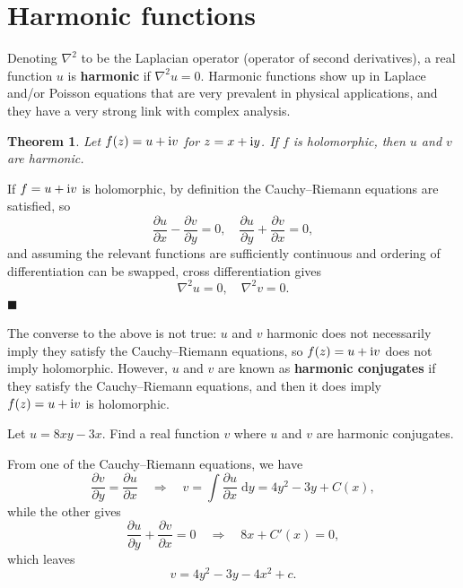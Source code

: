 \documentclass[letter-paper]{tufte-book}
\newtheorem{theorem}{\color{pastel-blue}Theorem}[section]
\newenvironment{proof}[1][Proof]{\begin{trivlist}
\item[\hskip \labelsep {\bfseries #1}]}{\end{trivlist}}
\newenvironment{example}[1][Example]{\begin{trivlist}
\item[\hskip \labelsep {\bfseries #1}]}{\end{trivlist}}
\newcommand{\zi}{{\rm i}}
\newcommand{\qed}{\hfill$\blacksquare$}
\begin{document}

\section{Harmonic functions}

Denoting $\nabla^2$ to be the Laplacian operator (operator of second
derivatives), a real function $u$ is \textbf{harmonic} if $\nabla^2 u = 0$.
Harmonic functions show up in Laplace and/or Poisson equations that are very
prevalent in physical applications, and they have a very strong link with
complex analysis.

\begin{theorem}
  Let $f(z) = u + \zi v$ for $z = x + \zi y$. If $f$ is holomorphic, then $u$
  and $v$ are harmonic.
\end{theorem}

\begin{proof}
  If $f = u + \zi v$ is holomorphic, by definition the Cauchy--Riemann equations
  are satisfied, so
  \begin{equation*}
    \frac{\partial u}{\partial x} - \frac{\partial v}{\partial y} = 0, \quad
    \frac{\partial u}{\partial y} + \frac{\partial v}{\partial x} = 0,
  \end{equation*}
  and assuming the relevant functions are sufficiently continuous and ordering
  of differentiation can be swapped, cross differentiation gives
  \begin{equation*}
    \nabla^2 u = 0, \quad \nabla^2 v = 0.
  \end{equation*}
  \qed
\end{proof}

The converse to the above is not true: $u$ and $v$ harmonic does not necessarily
imply they satisfy the Cauchy--Riemann equations, so $f(z) = u + \zi v$ does not
imply holomorphic. However, $u$ and $v$ are known as \textbf{harmonic
conjugates} if they satisfy the Cauchy--Riemann equations, and then it does
imply $f(z) = u + \zi v$ is holomorphic.

\begin{example}
  Let $u = 8xy - 3x$. Find a real function $v$ where $u$ and $v$ are harmonic
  conjugates.
  
  From one of the Cauchy--Riemann equations, we have
  \begin{equation*}
    \frac{\partial v}{\partial y} = \frac{\partial u}{\partial x} \quad \Rightarrow \quad v = \int \frac{\partial u}{\partial x}\; \mathrm{d}y = 4y^2 - 3y + C(x),
  \end{equation*}
  while the other gives 
  \begin{equation*}
    \frac{\partial u}{\partial y} + \frac{\partial v}{\partial x} = 0 \quad \Rightarrow \quad 8x + C'(x) = 0,
  \end{equation*}
  which leaves
  \begin{equation*}
    v = 4y^2 - 3y - 4x^2 + c.
  \end{equation*}
\end{example}
\end{document}
